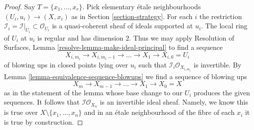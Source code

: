 \documentclass{stacks-project}
\theoremstyle{plain}
\theoremstyle{definition}
\theoremstyle{remark}
\numberwithin{equation}{subsection}
\begin{document}
\begin{proof}
Say $T = \{x_1, \ldots, x_r\}$. Pick elementary \'etale neighbourhoods
$(U_i, u_i) \to (X, x_i)$ as in Section \ref{section-strategy}.
For each $i$ the restriction
$\mathcal{I}_i = \mathcal{I}|_{U_i} \subset \mathcal{O}_{U_i}$
is a quasi-coherent sheaf of ideals supported at $u_i$.
The local ring of $U_i$ at $u_i$ is regular and has dimension $2$.
Thus we may apply
Resolution of Surfaces, Lemma \ref{resolve-lemma-make-ideal-principal}
to find a sequence
$$
X_{i, m_i} \to X_{i, m_i - 1} \to \ldots \to X_1 \to X_{i, 0} = U_i
$$
of blowing ups in closed points lying over $u_i$ such that
$\mathcal{I}_i \mathcal{O}_{X_{i, m_i}}$ is invertible.
By Lemma \ref{lemma-equivalence-sequence-blowups}
we find a sequence of blowing ups
$$
X_m \to X_{m - 1} \to \ldots \to X_1 \to X_0 = X
$$
as in the statement of the lemma whose base change to our $U_i$
produces the given sequences. It follows that
$\mathcal{I}\mathcal{O}_{X_n}$ is an invertible ideal sheaf.
Namely, we know this is true over $X \setminus \{x_1, \ldots, x_n\}$
and in an \'etale neighbourhood of the fibre of each $x_i$
it is true by construction.
\end{proof}
\end{document}
